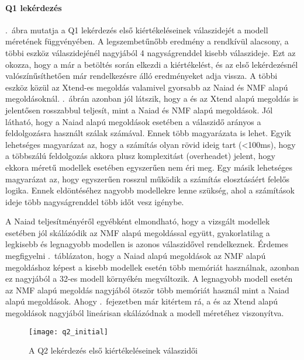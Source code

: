 \paragraph{Q1 lekérdezés}

.~ábra mutatja a Q1 lekérdezés első kiértékeléseinek válaszidejét a modell méretének függvényében. A legszembetűnőbb eredmény a \viatra rendkívül alacsony, a többi eszköz válaszidejénél nagyjából 4 nagyságrenddel kisebb válaszideje. Ezt az okozza, hogy a \viatra már a betöltés során elkezdi a kiértékelést, és az első lekérdezésnél valószínűsíthetően már rendelkezésre álló eredményeket adja vissza. A többi eszköz közül az Xtend-es megoldás valamivel gyorsabb az Naiad és NMF alapú megoldásoknál. .~ábrán azonban jól látszik, hogy a \viatra és az Xtend alapú megoldás is jelentősen rosszabbul teljesít, mint a Naiad és NMF alapú megoldások. Jól látható, hogy a Naiad alapú megoldások esetében a válaszidő arányos a feldolgozásra használt szálak számával. Ennek több magyarázata is lehet. Egyik lehetséges magyarázat az, hogy a számítás olyan rövid ideig tart (<100ms), hogy a többszálú feldolgozás akkora plusz komplexitást (overheadet) jelent, hogy ekkora méretű modellek esetében egyszerűen nem éri meg. Egy másik lehetséges magyarázat az, hogy egyszerűen rosszul működik a számítás elosztásáért felelős logika. Ennek eldöntéséhez nagyobb modellekre lenne szükség, ahol a számítások ideje több nagyságrenddel több időt vesz igénybe.

A Naiad teljesítményéről egyébként elmondható, hogy a vizsgált modellek esetében jól skálázódik az NMF alapú megoldással együtt, gyakorlatilag a legkisebb és legnagyobb modellen is azonos válaszidővel rendelkeznek. Érdemes megfigyelni .~táblázaton, hogy a Naiad alapú megoldások az NMF alapú megoldáshoz képest a kisebb modellek esetén több memóriát használnak, azonban ez nagyjából a 32-es modell környékén megváltozik. A legnagyobb modell esetén az NMF alapú megoldás nagyjából ötször több memóriát használ mint a Naiad alapú megoldások. Ahogy .~fejezetben már kitértem rá, a \viatra és az Xtend alapú megoldások nagyjából lineárisan skálázódnak a modell méretéhez viszonyítva.

\begin{figure}[htb]
	\centering
	\texttt{[image: q2\_initial]}
	\caption{A Q2 lekérdezés első kiértékeléseinek válaszidői}
	\label{fig:q2_initial}
\end{figure}

